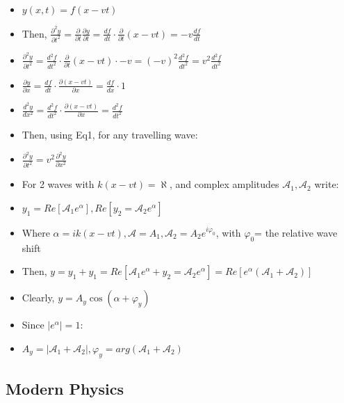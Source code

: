 \documentclass{article}
\begin{document}
\begin{itemize}
    \item \(y(x, t)=f(x-vt)\)
    \item Then, \(\frac{\partial^2 y}{\partial t^2}=\frac{\partial}{\partial t}\frac{\partial y}{\partial t}=\frac{df}{dt}\cdot \frac{\partial}{\partial t}(x-vt)=-v\frac{df}{dt}\)
    \item \(\frac{\partial^2 y}{\partial t^2}=\frac{d^2 f}{dt^2}\cdot\frac{\partial}{\partial t}(x-vt)\cdot -v=(-v)^2\frac{d^2f}{dt^2}=v^2\frac{d^2f}{dt^2}\)
    \item \(\frac{\partial y}{\partial x}=\frac{df}{dt}\cdot \frac{\partial (x-vt)}{\partial x}=\frac{df}{dx}\cdot 1\)
    \item \(\frac{d^2y}{dx^2}=\frac{d^2f}{dt^2}\cdot \frac{\partial (x-vt)}{\partial x}=\frac{d^2f}{dt^2}\)
    \item Then, using Eq1, for any travelling wave:
    \item \(\boxed{\frac{\partial^2 y}{\partial t^2}=v^2\frac{\partial^2 y}{\partial x^2}}\) 
    
\end{itemize}

\begin{itemize}
    \item For 2 waves with \(k(x-vt)=\aleph\), and complex amplitudes \(\mathcal{A}_1, \mathcal{A}_2\) write:
    \item \(y_1=Re[\mathcal{A}_1e^{\alpha}], Re[y_2=\mathcal{A}_2e^{\alpha}]\)
    \item Where \(\alpha =ik(x-vt), \mathcal{A}=A_1, \mathcal{A}_2=A_2e^{i\varphi_0}\), with \(\varphi_0\)= the relative wave shift
    \item Then, \(y=y_1+y_1=Re[\mathcal{A}_1e^{\alpha}+y_2=\mathcal{A}_2e^{\alpha}]=Re[e^{\alpha}(\mathcal{A}_1+\mathcal{A}_2)]\)
    \item Clearly, \(y=A_y\cos(\alpha+\varphi_y)\)
    \item Since \(|e^{\alpha}|=1\):
    \item \(\boxed{A_y=|\mathcal{A}_1+\mathcal{A}_2|, \varphi_y=arg(\mathcal{A}_1+\mathcal{A}_2)}\)
\end{itemize}


\subsection{Modern Physics}
\end{document}
